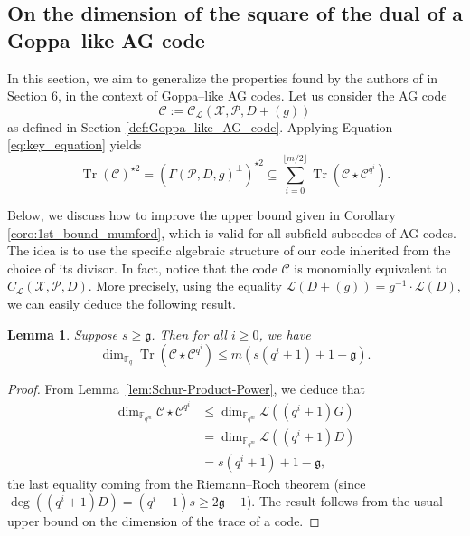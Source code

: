 \documentclass[lettersize,journal]{IEEEtran}
\theoremstyle{plain}
\newtheorem{lemma}[thm]{Lemma}
\theoremstyle{definition}
\theoremstyle{remark}
\DeclareMathOperator{\trace}{Tr}
\newcommand{\calP}{\mathcal{P}}
\newcommand{\calL}{\mathcal{L}}
\newcommand{\calC}{\mathcal{C}}
\newcommand{\calX}{\mathcal{X}}
\newcommand{\fqm}{\mathbb{F}_{q^m}}
\newcommand{\fq}{\mathbb{F}_{q}}
\newcommand{\Tr}[1]{\trace\!\left(#1\right)}
\begin{document}
	\subsection{On the dimension of the square of the dual of a Goppa--like AG code} \label{section:1st_improvement}
	In this section, we aim to generalize the properties found by the authors of \cite{MT21} in Section 6, in the context of Goppa--like AG codes. Let us consider the AG code 
	$$\calC := \calC_{\calL}(\calX,\calP,D+(g))$$
	as defined in Section \ref{def:Goppa--like_AG_code}. Applying Equation \eqref{eq:key_equation} yields   
	\begin{equation} \label{eq:key_equation_Goppa--like} 
		\Tr{\calC}^{\star 2} = (\Gamma(\calP,D,g)^{\perp})^{\star2} \subseteq \sum\limits_{i=0}^{\lfloor{m/2} \rfloor} \Tr{\calC\star \calC^{q^i}}.
	\end{equation}
	
	Below, we discuss how to improve the upper bound given in Corollary \ref{coro:1st_bound_mumford}, which is valid for all subfield subcodes of AG codes. The idea is to use the specific algebraic structure of our code inherited from the choice of its divisor.
	\noindent In fact, notice that the code $\calC$ is monomially equivalent to $C_{\calL}(\calX,\calP,D)$. 
	More precisely, using the equality $\calL(D+(g)) = g^{-1} \cdot \calL(D),$
	we can easily deduce the following result.
	
	\begin{lemma} \label{lem:bound_dim_Tr(C*C^q^i)}
		Suppose $s \geq \mathfrak{g}$. Then for all $i \geq 0$, we have 
		$$\dim_{\fq} \Tr{\calC\star \calC^{q^i}} \leq m\left(s\left(q^i+1\right)+1-\mathfrak{g}\right).$$
	\end{lemma}
	\begin{proof}
		From Lemma~\ref{lem:Schur-Product-Power}, we deduce that 
		\[
		\begin{aligned}
		\dim_{\fqm} \calC\star \calC^{q^i} &\leq \dim_{\fqm} \calL((q^i+1)G) \\
											&= \dim_{\fqm} \calL((q^i+1)D) \\
											&= s(q^i+1)+1-\mathfrak{g},
		\end{aligned}\]
		the last equality coming from the Riemann--Roch theorem (since $\deg \left((q^i+1)D\right) =(q^i+1)s \geq 2\mathfrak{g}-1$). The result follows from the usual upper bound on the dimension of the trace of a code. 
	\end{proof}
	
\end{document}
